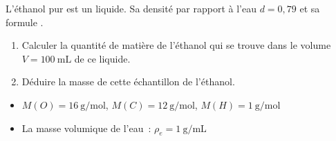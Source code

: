 L'éthanol pur est un liquide. Sa densité par rapport à l'eau $d=0,79$
et sa formule .
\begin{enumerate}
    \item Calculer la quantité de matière de l'éthanol qui se trouve
          dans le volume $V=\qty{100}{\mL}$ de ce liquide.
    \item Déduire la masse de cette échantillon de l'éthanol.
\end{enumerate}

\begin{donnees}
    \begin{itemize}
        \item $M(O)=\qty{16}{\g\per\mol}$,
              $M(C)=\qty{12}{\g\per\mol}$, $M(H)=\qty{1}{\g\per\mol}$
        \item La masse volumique de l'eau~: $\rho_e=\qty{1}{\g\per\mL}$
    \end{itemize}
\end{donnees}
